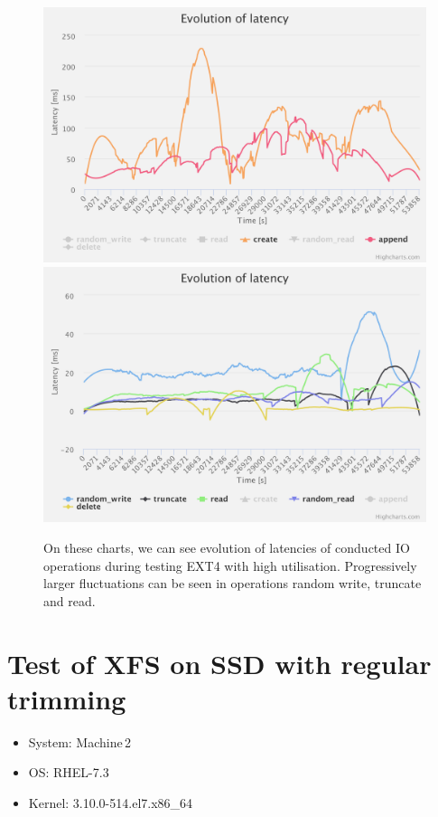 \documentclass[
  color, %
  table, %
  lof,   %
  lot,   %
]{fithesis3}
\begin{document}
\begin{figure}[!htb]
    \centering
   \begin{minipage}{\textwidth}
        \centering
        \includegraphics[width=\textwidth]{../charts/HDD_ext4/ca}
        \includegraphics[width=\textwidth]{../charts/HDD_ext4/o}
                \caption[Evolution of latencies of EXT4 during testing of high utilisation of HDD]{On these charts, we can see evolution of latencies of conducted IO operations during testing EXT4 with high utilisation. Progressively larger fluctuations can be seen in operations random write, truncate and read.}
\label{fig:lats_ext4}
    \end{minipage}
\end{figure}

\clearpage



\section{Test of XFS on SSD with regular trimming}
\begin{itemize}
\itemsep0em 
   \item System: Machine\,2
   \item OS: RHEL-7.3
   \item Kernel: 3.10.0-514.el7.x86\_64
\end{itemize}
\end{document}
